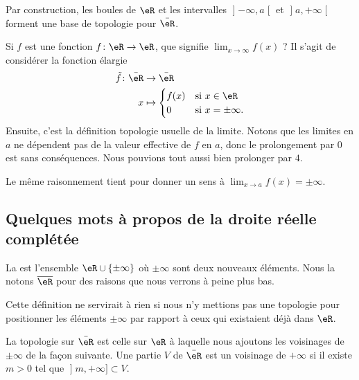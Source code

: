 Par construction, les boules de \( \eR\) et les intervalles \( \mathopen] -\infty , a \mathclose[\) et \( \mathopen] a , +\infty \mathclose[\) forment une base de topologie pour \( \bar \eR\).

Si \( f\) est une fonction \( f\colon \eR\to \eR\), que signifie \( \lim_{x\to \infty} f(x)\) ? Il s'agit de considérer la fonction élargie
\begin{equation}
    \begin{aligned}
        \tilde f\colon \bar \eR&\to \bar\eR \\
        x&\mapsto \begin{cases}
            f(x)    &   \text{si } x\in \eR\\
            0    &    \text{si } x=\pm\infty.
        \end{cases}
    \end{aligned}
\end{equation}
Ensuite, c'est la définition topologie usuelle de la limite. Notons que les limites en \( a\) ne dépendent pas de la valeur effective de \( f\) en \( a\), donc le prolongement par \( 0\) est sans conséquences. Nous pouvions tout aussi bien prolonger par \( 4\).

Le même raisonnement tient pour donner un sens à \( \lim_{x\to a} f(x)=\pm \infty\).

\subsection{Quelques mots à propos de la droite réelle complétée} 

\begin{definition}
    La  est l'ensemble \( \eR\cup\{ \pm \infty \}\) où \( \pm\infty\) sont deux nouveaux éléments. Nous la notons \( \overline{ \eR }\) pour des raisons que nous verrons à peine plus bas.
\end{definition}

Cette définition ne servirait à rien si nous n'y mettions pas une topologie pour positionner les éléments \( \pm\infty\) par rapport à ceux qui existaient déjà dans \( \eR\).

\begin{definition}
La topologie sur \(\bar \eR\) est celle sur \( \eR\) à laquelle nous ajoutons les voisinages de \( \pm\infty\) de la façon suivante. Une partie \( V\) de \( \bar \eR\) est un voisinage de \( +\infty\) si il existe \( m>0\) tel que \( \mathopen] m , +\infty \mathclose]\subset V\).
\end{definition}

